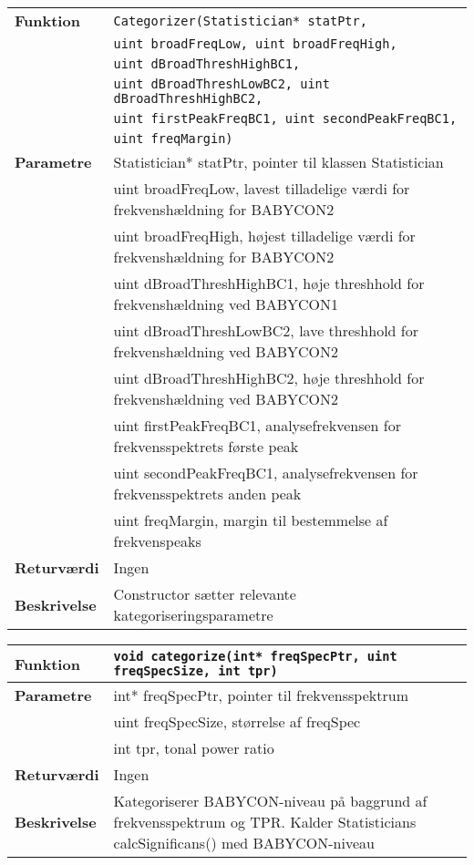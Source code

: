 \begin{center}
    \begin{tabular}{ | l | p{} |}
    \hline
    \textbf{Funktion}	& \verb+Categorizer(Statistician* statPtr,+ \\
    					& \verb+uint broadFreqLow, uint broadFreqHigh,+\\
    					& \verb+uint dBroadThreshHighBC1,+\\
    					& \verb+uint dBroadThreshLowBC2, uint dBroadThreshHighBC2,+ \\
    					& \verb+uint firstPeakFreqBC1, uint secondPeakFreqBC1,+ \\
    					& \verb+uint freqMargin) +						\\ \hline
    \textbf{Parametre} 	& Statistician* statPtr, pointer til klassen Statistician \\
    					& uint broadFreqLow, lavest tilladelige værdi for frekvenshældning for BABYCON2 \\
    					& uint broadFreqHigh, højest tilladelige værdi for frekvenshældning for BABYCON2 \\
    					& uint dBroadThreshHighBC1, høje threshhold for frekvenshældning ved BABYCON1 \\
    					& uint dBroadThreshLowBC2, lave threshhold for frekvenshældning ved BABYCON2  \\
    					& uint dBroadThreshHighBC2, høje threshhold for frekvenshældning ved BABYCON2 \\
    					& uint firstPeakFreqBC1, analysefrekvensen for frekvensspektrets første peak       \\	
    					& uint secondPeakFreqBC1, analysefrekvensen for frekvensspektrets anden peak \\
    					& uint freqMargin, margin til bestemmelse af frekvenspeaks \\ \hline
    \textbf{Returværdi}	& Ingen	 								\\ \hline
    \textbf{Beskrivelse}& Constructor sætter relevante kategoriseringsparametre		\\ \hline
    \end{tabular}
\end{center}

\begin{center}
    \begin{tabular}{ | l | p{} |}
    \hline
    \textbf{Funktion}	& \verb+void categorize(int* freqSpecPtr, uint freqSpecSize, int tpr) +						\\ \hline
    \textbf{Parametre} 	& int* freqSpecPtr, pointer til frekvensspektrum \\
    					& uint freqSpecSize, størrelse af freqSpec \\
    					& int tpr, tonal power ratio	\\ \hline
    \textbf{Returværdi}	& Ingen	 								\\ \hline
    \textbf{Beskrivelse}& Kategoriserer BABYCON-niveau på baggrund af frekvensspektrum og TPR. Kalder Statisticians calcSignificans() med BABYCON-niveau		\\ \hline
    \end{tabular}
\end{center}

